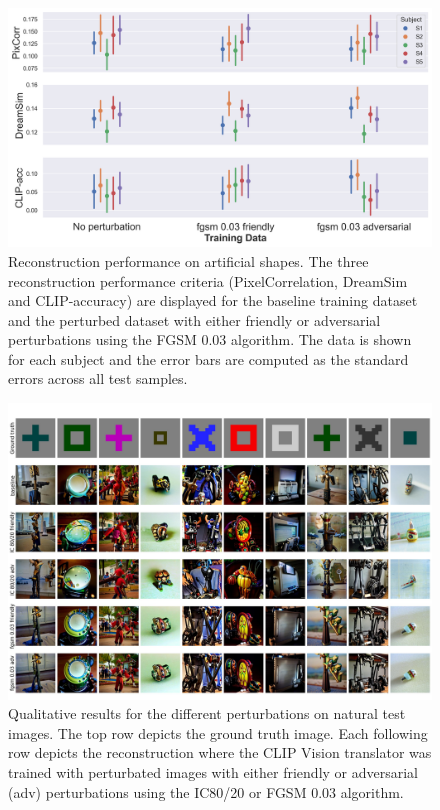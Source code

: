 \begin{figure}[H]
    \centering
    \includegraphics[width=1\textwidth]{plots/advpert_reconstruction_art_fgsm_0.03.png}
    \caption[Experiment 3: Reconstruction performance on artificial shapes with FGSM]{Reconstruction performance on artificial shapes. The three reconstruction performance criteria (PixelCorrelation, DreamSim and CLIP-accuracy) are displayed for the baseline training dataset and the perturbed dataset with either friendly or adversarial perturbations using the FGSM 0.03 algorithm. The data is shown for each subject and the error bars are computed as the standard errors across all test samples.}\label{fig:advpert_reconstruction_art_fgsm_0.03}
\end{figure}

\begin{figure}[H]
   \centering
   \includegraphics[width=1\textwidth]{plots/advpert_qual_test.JPEG}
   \caption[Experiment 3: Reconstructed images on natural test images for different perturbations]{Qualitative results for the different perturbations on natural test images. The top row depicts the ground truth image. Each following row depicts the reconstruction where the CLIP Vision translator was trained with perturbated images with either friendly or adversarial (adv) perturbations using the IC80/20 or FGSM 0.03 algorithm.}\label{fig:advpert_qual_test}
\end{figure}

